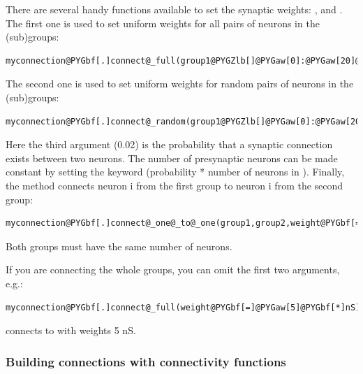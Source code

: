 \documentclass[letterpaper,10pt,english]{manual}
\begin{document}
There are several handy functions available to set the synaptic weights:
,  and
. The first one
is used to set uniform weights for all pairs of neurons in the (sub)groups:

\begin{Verbatim}[commandchars=@\[\]]
myconnection@PYGbf[.]connect@_full(group1@PYGZlb[]@PYGaw[0]:@PYGaw[20]@PYGZrb[],group2@PYGZlb[]@PYGaw[10]:@PYGaw[40]@PYGZrb[],weight@PYGbf[=]@PYGaw[5]@PYGbf[*]nS)
\end{Verbatim}

The second one is used to set uniform weights for random pairs of neurons in the (sub)groups:

\begin{Verbatim}[commandchars=@\[\]]
myconnection@PYGbf[.]connect@_random(group1@PYGZlb[]@PYGaw[0]:@PYGaw[20]@PYGZrb[],group2@PYGZlb[]@PYGaw[10]:@PYGaw[40]@PYGZrb[],sparseness@PYGbf[=]@PYGaw[0.02],weight@PYGbf[=]@PYGaw[5]@PYGbf[*]nS)
\end{Verbatim}

Here the third argument (0.02) is the probability that a synaptic connection exists between two neurons.
The number of presynaptic neurons can be made constant by setting the keyword 
(probability * number of neurons in ).
Finally, the method  connects neuron i from the first
group to neuron i from the second group:

\begin{Verbatim}[commandchars=@\[\]]
myconnection@PYGbf[.]connect@_one@_to@_one(group1,group2,weight@PYGbf[=]@PYGaw[3]@PYGbf[*]nS)
\end{Verbatim}

Both groups must have the same number of neurons.

If you are connecting the whole groups, you can omit the first two arguments, e.g.:

\begin{Verbatim}[commandchars=@\[\]]
myconnection@PYGbf[.]connect@_full(weight@PYGbf[=]@PYGaw[5]@PYGbf[*]nS)
\end{Verbatim}

connects  to  with weights 5 nS.


\subsubsection{Building connections with connectivity functions}
\end{document}
